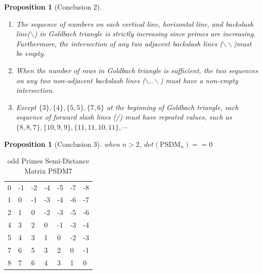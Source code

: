 \documentclass[12pt,a4paper,reqno]{amsart}
\numberwithin{equation}{section}
\theoremstyle{plain}
\newtheorem{proposition}[theorem]{Proposition}
\theoremstyle{definition}
\begin{document}
	\begin{proposition}[Conclusion 2]
		\begin{enumerate}
			\item The sequence of numbers on each vertical line, horizontal line, 
			and backslash line($\backslash$) in Goldbach triangle is strictly 
			increasing since primes are increasing. Furthermore, the 
			intersection of any two adjacent backslash lines ($\backslash \backslash$)must be empty. 
			\item When the number of rows in Goldbach triangle is sufficient, 
			the two sequences on any two non-adjacent backslash lines ($\backslash..\backslash$) must have a non-empty intersection. 
			\item Except $\{3\}, \{4\}, \{5, 5\}, \{7, 6\}$ at the beginning of Goldbach triangle, 
			each sequence of forward slash lines (/) must have repeated values, such as \\
			$\{8,8,7\}, \{10,9,9\},\{11,11,10,11\},\cdots$
		\end{enumerate}		
	\end{proposition}

	\begin{proposition}[Conclusion 3]
		when $n>2$, $det(\text{PSDM}_n)==0$
	\end{proposition}
	\begin{table}[h]
		\caption{odd Primes Semi-Distance Matrix PSDM7}
		\label{table:2}
		\begin{tabular}{lllllll}
		0 & -1 & -2 & -4 & -5 & -7 & -8 \\
		1 & 0  & -1 & -3 & -4 & -6 & -7 \\
		2 & 1  & 0  & -2 & -3 & -5 & -6 \\
		4 & 3  & 2  & 0  & -1 & -3 & -4 \\
		5 & 4  & 3  & 1  & 0  & -2 & -3 \\
		7 & 6  & 5  & 3  & 2  & 0  & -1 \\
		8 & 7  & 6  & 4  & 3  & 1  & 0 
		\end{tabular}
	\end{table}








\clearpage


\end{document}
